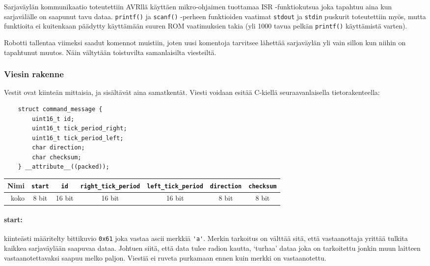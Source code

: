 \documentclass[]{article} %
\numberwithin{equation}{section}
\numberwithin{figure}{section}
\numberwithin{table}{section}
\begin{document}
Sarjaväylän kommunikaatio toteutettiin AVRllä käyttäen mikro-ohjaimen tuottamaa ISR -funktiokutsua joka tapahtuu aina kun sarjavälälle on saapunut tavu dataa. \verb+printf()+ ja \verb+scanf()+ -perheen funktioiden vaatimat \verb+stdout+ ja \verb+stdin+ puskurit toteutettiin myös, mutta funktioita ei kuitenkaan päädytty käyttämään suuren ROM vaatimuksien takia (yli 1000 tavua pelkän \verb+printf()+ käyttämistä varten).

Robotti tallentaa viimeksi saadut komennot muistiin, joten uusi komentoja tarvitsee lähettää sarjaväylän yli vain sillon kun niihin on tapahtunut muutos. Näin vältytään toistuvilta samanlaisilta viesteiltä.

\subsubsection{Viesin rakenne}
\label{sub:Viesin rakenne}


Vestit ovat kiinteän mittaisia, ja sisältävät aina samatkentät. Viesti voidaan esitää C-kiellä seuraavanlaisella tietorakenteella:


\begin{verbatim}
    struct command_message {
        uint16_t id;
        uint16_t tick_period_right;
        uint16_t tick_period_left;
        char direction;
        char checksum;
    } __attribute__((packed));
\end{verbatim}

\begin{center}
\begin{tabular}{|r|c|c|c|c|c|c|}
    \hline
    Nimi & \verb+start+ & \verb+id+ & \verb+right_tick_period+ & \verb+left_tick_period+ & \verb+direction+ & \verb+checksum+ \\
    \hline
    koko & 8 bit & 16 bit & 16 bit & 16 bit & 8 bit & 8 bit\\
    \hline
\end{tabular}
\end{center}


\paragraph{start:} kiinteästi määritelty bittikuvio \verb+0x61+ joka vastaa ascii merkkiä \verb+'a'+. Merkin tarkoitus on välttää sitä, että vastaanottaja yrittää tulkita kaikkea sarjaväylään saapuvaa dataa. Johtuen siitä, että data tulee radion kautta, `turhaa' dataa joka on tarkoitettu jonkin muun laitteen vastaanotettavaksi saapuu melko paljon. Viestiä ei ruveta purkamaan ennen kuin merkki on vastaanotettu.
\end{document}
